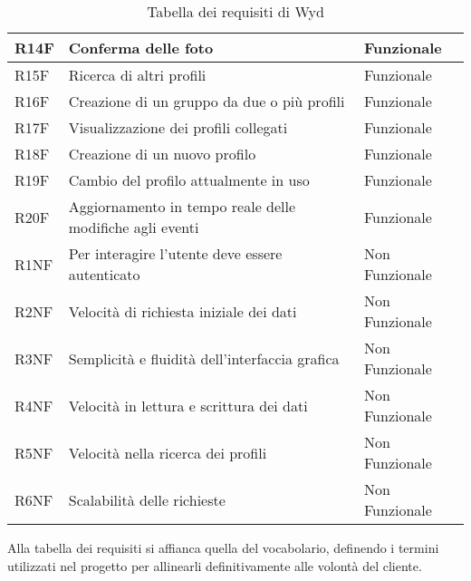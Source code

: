 \begin{table}
\begin{tabular} {|P{1.3cm}|P{11.2cm}|P{3cm}|}
        \hline
        R14F        & Conferma delle foto                                                         & Funzionale     \\
        \hline
        R15F        & Ricerca di altri profili                                                    & Funzionale     \\
        \hline
        R16F        & Creazione di un gruppo da due o più profili                                 & Funzionale     \\
        \hline
        R17F        & Visualizzazione dei profili collegati                                       & Funzionale     \\
        \hline
        R18F        & Creazione di un nuovo profilo                                               & Funzionale     \\
        \hline
        R19F        & Cambio del profilo attualmente in uso                                       & Funzionale     \\
        \hline
        R20F        & Aggiornamento in tempo reale delle modifiche agli eventi                    & Funzionale     \\
        \hline
        R1NF        & Per interagire l’utente deve essere autenticato                             & Non Funzionale \\
        \hline
        R2NF        & Velocità di richiesta iniziale dei dati                                     & Non Funzionale \\
        \hline
        R3NF        & Semplicità e fluidità dell'interfaccia grafica                              & Non Funzionale \\
        \hline
        R4NF        & Velocità in lettura e scrittura dei dati                                    & Non Funzionale \\
        \hline
        R5NF        & Velocità nella ricerca dei profili                                          & Non Funzionale \\
        \hline
        R6NF        & Scalabilità delle richieste                                                 & Non Funzionale \\
        \hline
    \end{tabular}
    \caption{Tabella dei requisiti di Wyd}
\end{table}
\clearpage

Alla tabella dei requisiti si affianca quella del vocabolario, 
definendo i termini utilizzati nel progetto per allinearli definitivamente alle volontà del cliente.\\

